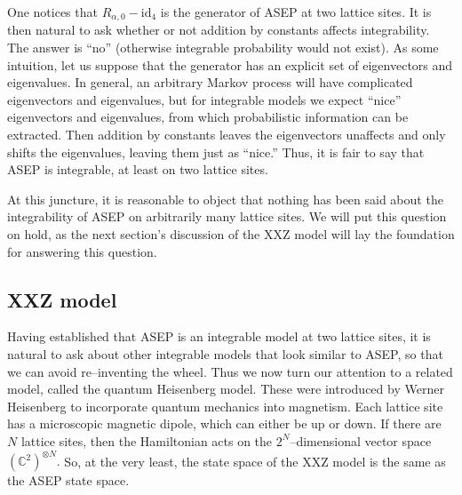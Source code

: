 \documentclass{ximera}
\begin{document}
One notices that \(R_{\alpha,0}-\mathrm{id}_4\) is the generator of ASEP at two lattice sites. It is then
natural to ask whether or not addition by constants affects integrability. The answer is ``no'' (otherwise 
integrable probability would not exist). As some intuition, let us suppose that the generator has an 
explicit set of eigenvectors and eigenvalues. In general, an arbitrary Markov process will have 
complicated eigenvectors and eigenvalues, but for integrable models we expect ``nice'' eigenvectors
and eigenvalues, from which probabilistic information can be extracted. Then addition by constants leaves
the eigenvectors unaffects and only shifts the eigenvalues, leaving them just as ``nice.'' Thus, 
it is fair to say that ASEP is integrable, at least on two lattice sites. 

At this juncture, it is reasonable to object that nothing has been said about the integrability of ASEP
on arbitrarily many lattice sites. We will put this question on hold, as the next section's discussion
of the XXZ model will lay the foundation for answering this question.


\subsection{XXZ model}
Having established that ASEP is an integrable model at two lattice sites, it is natural to ask about
other integrable models that look similar to ASEP, so that we can avoid re--inventing the wheel. Thus we 
now turn our attention to a related model, called the quantum Heisenberg model. These were introduced
by Werner Heisenberg to incorporate quantum mechanics into magnetism. Each lattice site has a microscopic
magnetic dipole, which can either be up or down. If there are \(N\) lattice sites, 
then the Hamiltonian acts on the \(2^N\)--dimensional vector space \((\mathbb{C}^2)^{\otimes N}.\)
So, at the very least, the state space of the XXZ model is the same as the ASEP state space. 
\end{document}
